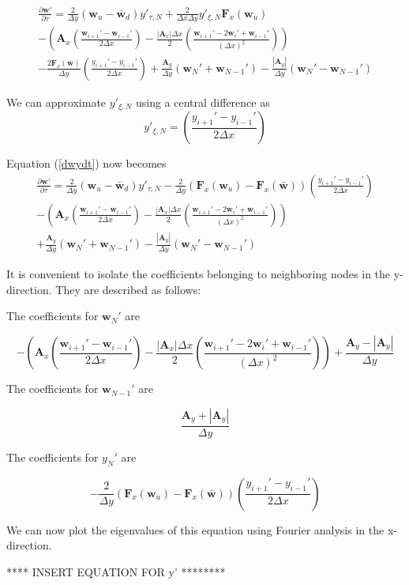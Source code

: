 \documentclass[10pt]{article}
\begin{document}
	\begin{multline}\label{dwydt}
		\frac{\partial \mathbf{w}'}{\partial \tau} = 
		\frac{2}{\Delta y} (\mathbf{w}_u - \bar{\mathbf{w}}_d) y'_{\tau,N}
		+ \frac{2}{\Delta x \Delta y} y'_{\xi,N} \mathbf{F}_{x}(\mathbf{w}_u)
		\\- \left( \mathbf{A}_x \left( \frac{\mathbf{w}_{i+1}' - \mathbf{w}_{i-1}'}{2 \Delta x}\right) - \frac{|\mathbf{A}_x| \Delta x}{2} \left( \frac{\mathbf{w}_{i+1}' - 2 \mathbf{w}_i' + \mathbf{w}_{i-1}'}{(\Delta x)^2} \right) \right)
		\\ - \frac{2 \mathbf{F}_{x}(\bar{\mathbf{w}})}{\Delta y}    \left( \frac{y_{i+1}' - y_{i-1}'}{2 \Delta x} \right)
		+ \frac{\mathbf{A}_y}{\Delta y} (\mathbf{w}_N' + \mathbf{w}_{N-1}')
		- \frac{|\mathbf{A}_y|}{\Delta y} (\mathbf{w}_N' - \mathbf{w}_{N-1}')
	\end{multline}

	We can approximate $y'_{\xi,N}$ using a central difference as
	\begin{equation}
		y'_{\xi,N} = \left( \frac{y_{i+1}' - y_{i-1}'}{2 \Delta x} \right)
	\end{equation}

	Equation (\ref{dwydt}) now becomes
	\begin{multline}
		\frac{\partial \mathbf{w}'}{\partial \tau} = 
		\frac{2}{\Delta y} (\mathbf{w}_u - \bar{\mathbf{w}}_d) y'_{\tau,N}
		- \frac{2}{\Delta y}(\mathbf{F}_{x}(\mathbf{w}_u) - \mathbf{F}_{x}(\bar{\mathbf{w}})) \left( \frac{y_{i+1}' - y_{i-1}'}{2 \Delta x} \right)
		\\- \left( \mathbf{A}_x \left( \frac{\mathbf{w}_{i+1}' - \mathbf{w}_{i-1}'}{2 \Delta x}\right) - \frac{|\mathbf{A}_x| \Delta x}{2} \left( \frac{\mathbf{w}_{i+1}' - 2 \mathbf{w}_i' + \mathbf{w}_{i-1}'}{(\Delta x)^2} \right) \right)
		\\ + \frac{\mathbf{A}_y}{\Delta y} (\mathbf{w}_N' + \mathbf{w}_{N-1}')
		- \frac{|\mathbf{A}_y|}{\Delta y} (\mathbf{w}_N' - \mathbf{w}_{N-1}')
	\end{multline}
	
	 It is convenient to isolate the coefficients belonging to neighboring nodes in the y-direction. They are described as follows:
	
	The coefficients for $\mathbf{w}_N'$ are
	
	$$ - \left( \mathbf{A}_x \left( \frac{\mathbf{w}_{i+1}' - \mathbf{w}_{i-1}'}{2 \Delta x}\right) - \frac{|\mathbf{A}_x| \Delta x}{2} \left( \frac{\mathbf{w}_{i+1}' - 2 \mathbf{w}_i' + \mathbf{w}_{i-1}'}{(\Delta x)^2} \right) \right) +  \frac{\mathbf{A}_y - |\mathbf{A}_y|}{\Delta y} $$
	
	The coefficients for $\mathbf{w}_{N-1}'$ are
	
	$$ \frac{\mathbf{A}_y + |\mathbf{A}_y|}{\Delta y} $$
	
	The coefficients for $y_N'$ are
	
	$$ - \frac{2}{\Delta y}(\mathbf{F}_{x}(\mathbf{w}_u) - \mathbf{F}_{x}(\bar{\mathbf{w}})) \left( \frac{y_{i+1}' - y_{i-1}'}{2 \Delta x} \right) $$
	
	We can now plot the eigenvalues of this equation using Fourier analysis in the x-direction. 
	
	**** INSERT EQUATION FOR y' ********
	
\end{document}
